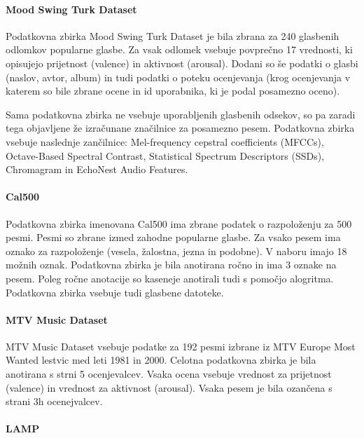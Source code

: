 \documentclass[a4paper, 12pt]{book}
\begin{document}
{\paragraph{Mood Swing Turk Dataset}

Podatkovna zbirka Mood Swing Turk Dataset \cite{schmidt2011modeling} je bila zbrana za 240 glasbenih odlomkov popularne glasbe. Za vsak odlomek vsebuje povprečno 17 vrednosti, ki opisujejo prijetnost (valence) in aktivnost (arousal). Dodani so še podatki o glasbi (naslov, avtor, album) in tudi podatki o poteku ocenjevanja (krog ocenjevanja v katerem so bile zbrane ocene in id uporabnika, ki je podal posamezno oceno). 

Sama podatkovna zbirka ne vsebuje uporabljenih glasbenih odsekov, so pa zaradi tega objavljene že izračunane značilnice za posamezno pesem. Podatkovna zbirka vsebuje naslednje zančilnice: Mel-frequency cepstral coefficients (MFCCs), Octave-Based Spectral Contrast, Statistical Spectrum Descriptors (SSDs), Chromagram in EchoNest Audio Features.

\paragraph{Cal500}

Podatkovna zbirka imenovana Cal500 \cite{turnbull2008semantic} ima zbrane podatek o razpoloženju za 500 pesmi. Pesmi so zbrane izmed zahodne popularne glasbe. Za vsako pesem ima oznako za razpoloženje (vesela, žalostna, jezna in podobne). V naboru imajo 18 možnih oznak. Podatkovna zbirka je bila anotirana ročno in ima 3 oznake na pesem. Poleg ročne anotacije so kaseneje anotirali tudi s pomočjo alogritma. Podatkovna zbirka vsebuje tudi glasbene datoteke.

\paragraph{MTV Music Dataset}

MTV Music Dataset \cite{schuller2010mister} vsebuje podatke za 192 pesmi izbrane iz MTV Europe Most Wanted lestvic med leti 1981 in 2000. Celotna podatkovna zbirka je bila anotirana s strni 5 ocenjevalcev. Vsaka ocena vsebuje vrednost za prijetnost (valence) in vrednost za aktivnost (arousal). Vsaka pesem je bila ozančena s strani 3h ocenejvalcev.

\paragraph{LAMP}

}
\end{document}
